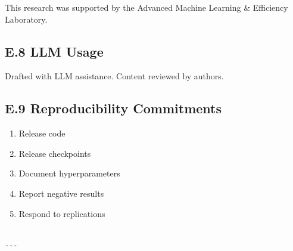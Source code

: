 This research was supported by the Advanced Machine Learning \& Efficiency Laboratory.

\subsection{E.8 LLM Usage}

Drafted with LLM assistance. Content reviewed by authors.

\subsection{E.9 Reproducibility Commitments}

\begin{enumerate}
\item Release code
\item Release checkpoints
\item Document hyperparameters
\item Report negative results
\item Respond to replications
\end{enumerate}
\begin{lstlisting}

---
\end{lstlisting}

